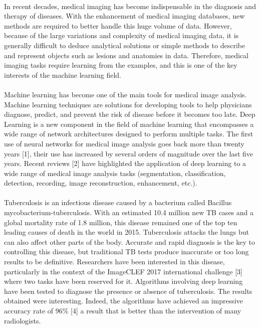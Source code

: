 \paragraph{}
In recent decades, medical imaging has become indispensable in the diagnosis and therapy of diseases. With the enhancement of medical imaging databases, new methods are required to better handle this huge volume of data. However, because of the large variations and complexity of medical imaging data, it is generally difficult to deduce analytical solutions or simple methods to describe and represent objects such as lesions and anatomies in data. Therefore, medical imaging tasks require learning from the examples, and this is one of the key interests of the machine learning field.
\paragraph{}
Machine learning has become one of the main tools for medical image analysis. Machine learning techniques are solutions for developing tools to help physicians diagnose, predict, and prevent the risk of disease before it becomes too late. Deep Learning is a new component in the field of machine learning that encompasses a wide range of network architectures designed to perform multiple tasks. The first use of neural networks for medical image analysis goes back more than twenty years [1], their use has increased by several orders of magnitude over the last five years. Recent reviews [2] have highlighted the application of deep learning to a wide range of medical image analysis tasks (segmentation, classification, detection, recording, image reconstruction, enhancement, etc.).
\paragraph{}
Tuberculosis is an infectious disease caused by a bacterium called Bacillus mycobacterium-tuberculosis. With an estimated 10.4 million new TB cases and a global mortality rate of 1.8 million, this disease remained one of the top ten leading causes of death in the world in 2015. Tuberculosis attacks the lungs but can also affect other parts of the body. Accurate and rapid diagnosis is the key to controlling this disease, but traditional TB tests produce inaccurate or too long results to be definitive. Researchers have been interested in this disease, particularly in the context of the ImageCLEF 2017 international challenge [3] where two tasks have been reserved for it. Algorithms involving deep learning have been tested to diagnose the presence or absence of tuberculosis. The results obtained were interesting. Indeed, the algorithms have achieved an impressive accuracy rate of 96\% [4] a result that is better than the intervention of many radiologists.

